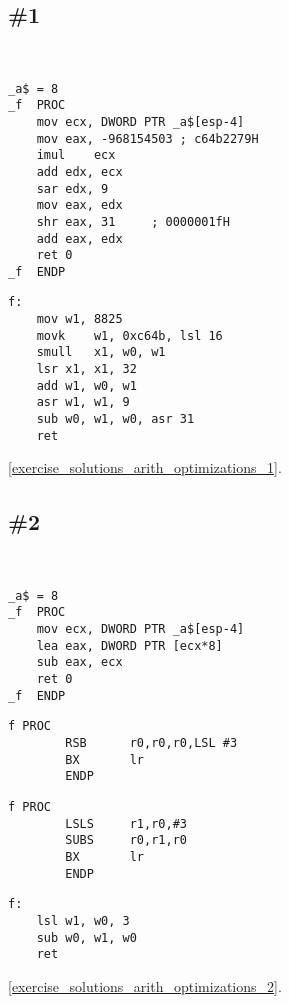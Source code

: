 \section{\Exercises}

\subsection{\Exercise \#1}
\label{exercise_arith_optimizations_1}

\WhatThisCodeDoes\

\begin{lstlisting}[caption=\Optimizing MSVC 2010]
_a$ = 8
_f	PROC
	mov	ecx, DWORD PTR _a$[esp-4]
	mov	eax, -968154503	; c64b2279H
	imul	ecx
	add	edx, ecx
	sar	edx, 9
	mov	eax, edx
	shr	eax, 31		; 0000001fH
	add	eax, edx
	ret	0
_f	ENDP
\end{lstlisting}

\begin{lstlisting}[caption=\Optimizing GCC 4.9 (ARM64)]
f:
	mov	w1, 8825
	movk	w1, 0xc64b, lsl 16
	smull	x1, w0, w1
	lsr	x1, x1, 32
	add	w1, w0, w1
	asr	w1, w1, 9
	sub	w0, w1, w0, asr 31
	ret
\end{lstlisting}

\Answer\: \ref{exercise_solutions_arith_optimizations_1}.

\subsection{\Exercise \#2}
\label{exercise_arith_optimizations_2}

\WhatThisCodeDoes\

\begin{lstlisting}[caption=\Optimizing MSVC 2010]
_a$ = 8
_f	PROC
	mov	ecx, DWORD PTR _a$[esp-4]
	lea	eax, DWORD PTR [ecx*8]
	sub	eax, ecx
	ret	0
_f	ENDP
\end{lstlisting}

\begin{lstlisting}[caption=\NonOptimizingKeilVI (\ARMMode)]
f PROC
        RSB      r0,r0,r0,LSL #3
        BX       lr
        ENDP
\end{lstlisting}

\begin{lstlisting}[caption=\NonOptimizingKeilVI (\ThumbMode)]
f PROC
        LSLS     r1,r0,#3
        SUBS     r0,r1,r0
        BX       lr
        ENDP
\end{lstlisting}

\begin{lstlisting}[caption=\Optimizing GCC 4.9 (ARM64)]
f:
	lsl	w1, w0, 3
	sub	w0, w1, w0
	ret
\end{lstlisting}

\Answer\: \ref{exercise_solutions_arith_optimizations_2}.

